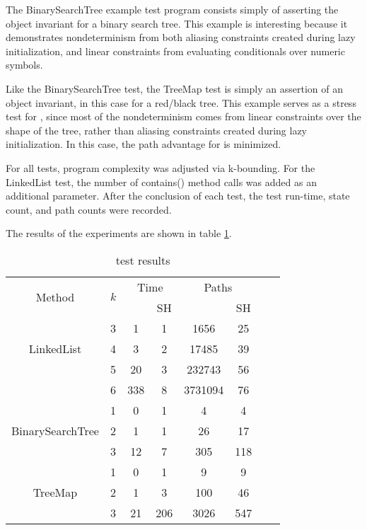 The BinarySearchTree example test program consists simply of asserting the object invariant for a binary search tree. This example is interesting because it demonstrates nondeterminism from both aliasing constraints created during lazy initialization, and linear constraints from evaluating conditionals over numeric symbols. 

Like the BinarySearchTree test, the TreeMap test is simply an assertion of an object invariant, in this case for a red/black tree. This example serves as a stress test for \symtxt{}, since most of the nondeterminism comes from linear constraints over the shape of the tree, rather than aliasing constraints created during lazy initialization. In this case, the path advantage for \symtxt{} is minimized.

For all tests, program complexity was adjusted via k-bounding. For the LinkedList test, the number of contains() method calls was added as an additional parameter. After the conclusion of each test, the test run-time, state count, and path counts were recorded. 

The results of the experiments are shown in table \ref{tab:results}.

\begin{table} [h]
  \centering
  \begin{tabular}{| c | c | c | c | c | c | c | c |}
  \hline
   \multirow{2}{*}{Method }&\multirow{2}{*}{ $k$ }
   &\multicolumn{2}{|c|}{Time} &\multicolumn{2}{|c|}{ Paths }\\
								&	&\gsetxt{}	&SH	&\gsetxt{} & SH\\
   \hline
    \multirow{3}{*}{LinkedList }&3	& 1 & 1  &1656 & 25		 \\
   		 				& 4	& 3 & 2	&17485  & 39 \\
   						& 5	& 20 & 3	&232743 & 56\\
						& 6	& 338 & 8		&3731094 & 76\\
    \hline
    \multirow{3}{*}{BinarySearchTree }&1	& 0 & 1	& 4	 & 4\\
   		 				& 2	& 1 & 1 	& 26 & 17\\
   						& 3	& 12 & 7	& 305 & 118\\
    \hline
      \multirow{3}{*}{TreeMap}&1	& 0 & 1 	&9 & 9 \\
   		 				&2	& 1 & 3		& 100 & 46 \\
   						&3	&21 & 206	& 3026 & 547 \\
						
    \hline
  \end{tabular}
  \caption{test results}
  \label{tab:results}
\end{table}

